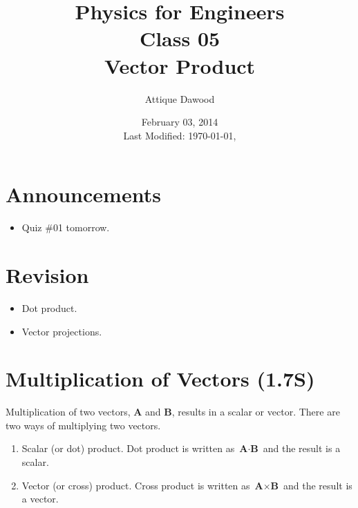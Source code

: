 \documentclass[12pt,a4paper]{article}
\title{\vspace{-2cm}Physics for Engineers\\Class 05\\Vector Product}
\author{Attique Dawood}
\date{February 03, 2014\\[0.2cm] Last Modified: \today, \currenttime}
\begin{document}
\maketitle
\section{Announcements}
\begin{itemize}
\item Quiz \#01 tomorrow.
\end{itemize}
\section{Revision}
\begin{itemize}
\item Dot product.
\item Vector projections.
\end{itemize}
\section{Multiplication of Vectors (1.7S)}
Multiplication of two vectors, \textbf{A} and \textbf{B}, results in a scalar or vector. There are two ways of multiplying two vectors.
\begin{enumerate}
\item Scalar (or dot) product. Dot product is written as $\textbf{A}\cdot \textbf{B}$ and the result is a scalar.
\item Vector (or cross) product. Cross product is written as $\textbf{A}\times \textbf{B}$ and the result is a vector.
\end{enumerate}
\end{document}
